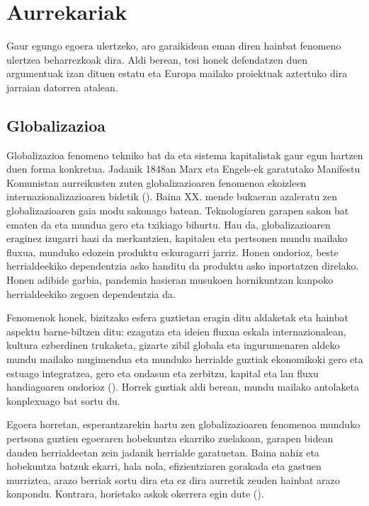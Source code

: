 \chapter{Aurrekariak}\label{cha:aurrekariak}

Gaur egungo egoera ulertzeko, aro garaikidean eman diren hainbat fenomeno ulertzea beharrezkoak dira. Aldi berean, tesi honek defendatzen duen argumentuak izan dituen estatu eta Europa mailako proiektuak aztertuko dira jarraian datorren atalean.

\section{Globalizazioa}\label{sec:globalizazioa}
Globalizazioa fenomeno tekniko bat da eta sistema kapitalistak gaur egun hartzen duen forma konkretua. Jadanik 1848an Marx eta Engels-ek garatutako Manifestu Komunistan aurreikusten zuten globalizazioaren fenomenoa ekoizleen internazionalizazioaren bidetik (\cite{prieto2005globalizacion}). Baina XX. mende bukaeran azaleratu zen globalizazioaren gaia modu sakonago batean. Teknologiaren garapen sakon bat ematen da eta mundua gero eta txikiago bihurtu. Hau da, globalizazioaren eraginez izugarri hazi da merkantzien, kapitalen eta pertsonen mundu mailako fluxua, munduko edozein produktu eskuragarri jarriz. Honen ondorioz, beste herrialdeekiko dependentzia asko handitu da produktu asko inportatzen direlako. Honen adibide garbia, pandemia hasieran musukoen hornikuntzan kanpoko herrialdeekiko zegoen dependentzia da.

Fenomenok honek, bizitzako esfera guztietan eragin ditu aldaketak eta hainbat aspektu barne-biltzen ditu: ezagutza eta ideien fluxua eskala internazionalean, kultura ezberdinen trukaketa, gizarte zibil globala eta ingurumenaren aldeko mundu mailako mugimendua eta munduko herrialde guztiak ekonomikoki gero eta estuago integratzea, gero eta ondasun eta zerbitzu, kapital eta lan fluxu handiagoaren ondorioz (\cite{stiglitz2006hacer}). Horrek guztiak aldi berean, mundu mailako antolaketa konplexuago bat sortu du.

Egoera horretan, esperantzarekin hartu zen globalizazioaren fenomenoa munduko pertsona guztien egoeraren hobekuntza ekarriko zuelakoan, garapen bidean dauden herrialdeetan zein jadanik herrialde garatuetan. Baina nahiz eta hobekuntza batzuk ekarri, hala nola, efizientziaren gorakada eta gastuen murriztea, arazo berriak sortu dira eta ez dira aurretik zeuden hainbat arazo konpondu. Kontrara, horietako askok okerrera egin dute (\cite{rodriguez2017aumentado}).

